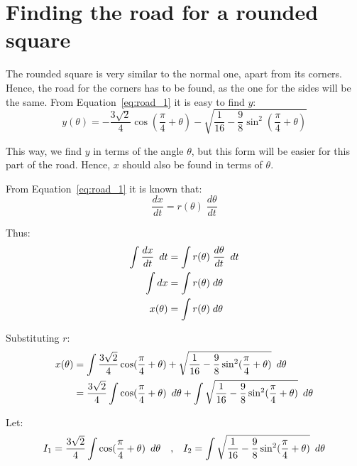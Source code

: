 \documentclass[12pt]{article}
\newcommand{\Hquad}{\hspace{0.5em}}
\begin{document}
    \section{Finding the road for a rounded square}

        The rounded square is very similar to the normal one, apart from its corners. Hence, the road for the corners has to be found, as the one for the sides will be the same. From Equation~\ref{eq:road_1} it is easy to find $y$:
        \begin{equation}\label{eq:rounded_ytheta}
            y(\theta) = - \frac{3\sqrt{2}}{4} \cos (\frac{\pi}{4} + \theta) - \sqrt{\frac{1}{16} - \frac{9}{8} \sin^2 (\frac{\pi}{4}+\theta)}
        \end{equation}

        This way, we find $y$ in terms of the angle $\theta$, but this form will be easier for this part of the road. Hence, $x$ should also be found in terms of $\theta$.

        From Equation~\ref{eq:road_1} it is known that:
        \begin{equation}
            \frac{dx}{dt} = r(\theta) \;\frac{d\theta}{dt}
        \end{equation}

        Thus:
        \begin{align}
            \int \frac{dx}{dt} \Hquad dt &= \int r(\theta) \;\frac{d\theta}{dt} \Hquad dt \\
            \int dx &= \int r(\theta) \;d\theta \\
            x(\theta) &= \int r(\theta) \;d\theta
        \end{align}

        Substituting $r$:
        \begin{align}
            x(\theta) &= \int \frac{3\sqrt{2}}{4} \cos (\frac{\pi}{4} + \theta) + \sqrt{\frac{1}{16} - \frac{9}{8} \sin^2 (\frac{\pi}{4}+\theta)} \Hquad d\theta \\
            &= \frac{3\sqrt{2}}{4} \int \cos (\frac{\pi}{4} + \theta) \Hquad d\theta + \int \sqrt{\frac{1}{16} - \frac{9}{8} \sin^2 (\frac{\pi}{4}+\theta)} \Hquad d\theta
        \end{align}

        Let:
        \begin{align}
            I_1 = \frac{3\sqrt{2}}{4} \int \cos (\frac{\pi}{4} + \theta) \Hquad d\theta \quad \text{,} \quad
            I_2 = \int \sqrt{\frac{1}{16} - \frac{9}{8} \sin^2 (\frac{\pi}{4}+\theta)} \Hquad d\theta
        \end{align}
\end{document}
